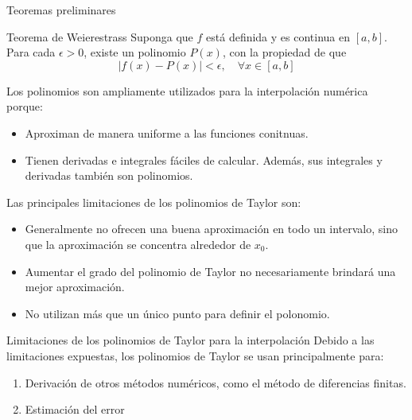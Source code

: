 \begin{frame}{Teoremas preliminares}
\begin{block}{Teorema de Weierestrass}
Suponga que $f$ está definida y es continua en $[a, b]$. Para cada $\epsilon>0$, existe un polinomio $P(x)$, con la propiedad de que 
$$|f(x)-P(x)|<\epsilon, \quad \forall x \in [a, b]$$
\end{block}
\indent Los polinomios son ampliamente utilizados para la interpolación numérica porque:
\begin{itemize}
\item Aproximan de manera uniforme a las funciones conitnuas. 
\item Tienen derivadas e integrales fáciles de calcular. Además, sus integrales y derivadas también son polinomios. 
\end{itemize}
\indent Las principales limitaciones de los polinomios de Taylor son:
\begin{itemize}
\item Generalmente no ofrecen una buena aproximación en todo un intervalo, sino que la aproximación se concentra alrededor de $x_0$.
\item Aumentar el grado del polinomio de Taylor no necesariamente brindará una mejor aproximación.   
\item No utilizan más que un único punto para definir el polonomio.  
\end{itemize}
\end{frame}
\begin{frame}{Limitaciones de los polinomios de Taylor para la interpolación}
\indent Debido a las limitaciones expuestas, los polinomios de Taylor se usan principalmente para:
\begin{enumerate}
\item Derivación de otros métodos numéricos, como el método de diferencias finitas.
\item Estimación del error
\end{enumerate}
\end{frame}

